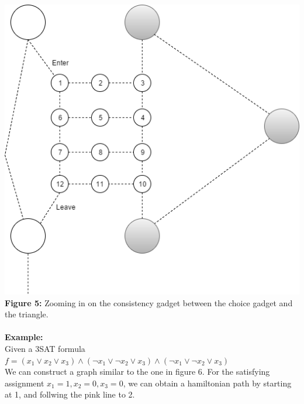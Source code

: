\includegraphics[scale=0.5]{HAMConsistency}\\
\textbf{Figure 5:} Zooming in on the consistency gadget between the choice gadget and the triangle.\\\\
\textbf{Example:}\\
Given a 3SAT formula  $f = (x_1 \lor x_2 \lor x_3) \land (\lnot x_1 \lor \lnot x_2 \lor x_3) \land (\lnot x_1 \lor \lnot x_2 \lor x_3)$\\
We can construct a graph similar to the one in figure 6. For the satisfying assignment $x_1 = 1, x_2 = 0, x_3 = 0$, we can obtain a hamiltonian path by starting at 1, and follwing the pink line to 2.
